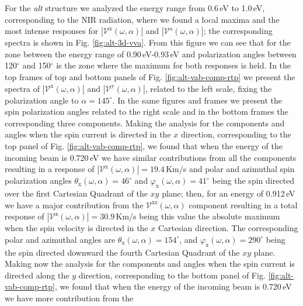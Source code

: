 \documentclass[prb,11pt,tightenlines,twocolumn,aps]{revtex4-1}
\begin{document}
For the \emph{alt} structure we analyzed the energy range from 0.6\,eV to
1.0\,eV, corresponding to the NIR radiation, where we found a local maxima and
the most intense responses for $|\mathcal{V}^{\mathrm{x}}(\omega,\alpha)|$ and
$|\mathcal{V}^{\mathrm{a}}(\omega,\alpha)|$; the corresponding spectra is
shown in Fig. \ref{fig:alt-3d-vva}.
%
From this figure we can see that for the zone between the energy range of
0.90\,eV-0.93\,eV and polarization angles between 120$^{\circ}$ and
150$^{\circ}$ is the zone where the maximum for both responses is held.
In the top frames of top and bottom panels of Fig. \ref{fig:alt-vab-comp-rtp} we
present the spectra of $|\mathcal{V}^{\mathrm{x}}(\omega,\alpha)|$ and
$|\mathcal{V}^{\mathrm{y}}(\omega,\alpha)|$, related to the left scale, fixing
the polarization angle to $\alpha=145^{\circ}$. In the same figures and frames
we present the spin polarization angles related to the right scale and in the
bottom frames the corresponding three components.
% 
Making the analysis for the components and angles when the spin current is
directed in the $x$ direction, corresponding to the top panel of Fig.
% 
\ref{fig:alt-vab-comp-rtp}, we found that when the energy of the incoming beam
is 0.720\,eV we have similar contributions from all the components resulting in
a response of $|\mathcal{V}^{\mathrm{x}}(\omega,\alpha)|=19.4$\,Km/s and polar
and azimuthal spin polarization angles $\theta_{\mathrm{x}}(\omega,\alpha) =
46^{\circ}$ and $\varphi_{\mathrm{x}}(\omega,\alpha) = 41^{\circ}$ being the
spin directed over the first Cartesian Quadrant of the $xy$ plane;
% 
then, for an energy of 0.912\,eV we have a major contribution from the
$\mathcal{V}^{\mathrm{xz}}(\omega,\alpha)$ component resulting in a total
response of $|\mathcal{V}^{\mathrm{x}}(\omega,\alpha)|=30.9$\,Km/s being this
value the absolute maximum when the spin velocity is directed in the $x$
Cartesian direction. The corresponding polar and azimuthal angles are
$\theta_{\mathrm{x}}(\omega,\alpha)=154^{\circ}$, and
$\varphi_{\mathrm{x}}(\omega,\alpha)=290^{\circ}$ being the spin directed
downward the fourth Cartesian Quadrant of the $xy$ plane.
% 
Making now the analysis for the components and angles when the spin current is
directed along the $y$ direction, corresponding to the bottom panel of Fig.
\ref{fig:alt-vab-comp-rtp}, we found that when the energy of the incoming beam
is 0.720\,eV we have more contribution from the
\end{document}
